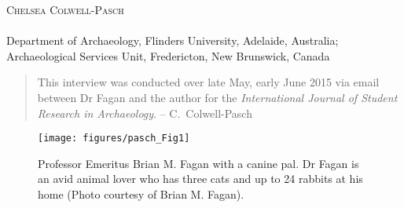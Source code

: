 \openingarticle
\def\ppages{\pagerange{Pasch:firstpage}{Pasch:lastpage}}
\def\shorttitle{Interview: Brian Fagan}
\def\maintitle{Brian Fagan, Ph.D. \emph{Professor Emeritus at the University of California, Santa Barbara}}
\def\shortauthor{Chelsea Colwell-Pasch}
\def\authormail{Chelsea.Colwell-Pasch@gnb.ca}
\def\affiliation{Department of Archaeology, Flinders University, Adelaide, Australia; \\ \noindent Archaeological Services Unit, Fredericton, New Brunswick, Canada}
\begin{center}
	{\Large\scshape\shortauthor}\\[1em]
	\email \\
	\affiliation
\end{center}
\vspace{3em}
\midarticle
\label{Pasch:firstpage}
 
\blockquote{This interview was conducted over late May, early June 2015 via email between Dr Fagan and the author for the \emph{International Journal of Student Research in Archaeology}. -- C.~Colwell-Pasch}	
	
	\begin{figure}[!htb]
		\texttt{[image: figures/pasch\_Fig1]}
		\centering
		\caption{Professor Emeritus Brian M. Fagan with a canine pal. Dr Fagan is an avid animal lover who has three cats and up to 24 rabbits at his home (Photo courtesy of Brian M. Fagan).}
		\label{fig:pasch_Fig1}
	\end{figure}
	
